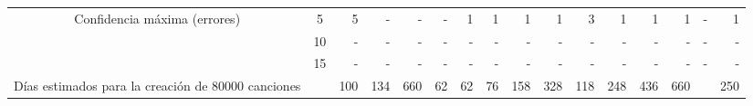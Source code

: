 \begin{sidewaystable}
\begin{tabular}{@{}ccc|rrrrrrrrrrrrrr@{}}
\midrule
\multicolumn{2}{c}{\multirow{3}{*}{Confidencia máxima (errores)}}  & 5                    & 5                      & -                      & -                      & -                      & 1                      & 1                      & 1                      & 1                      & 3                      & 1                      & 1                      & 1                      & -                      & 1                      \\
\multicolumn{2}{c}{}                                               & 10                   & -                      & -                      & -                      & -                      & -                      & -                      & -                      & -                      & -                      & -                      & -                      & -                      & -                      & -                      \\
\multicolumn{2}{c}{}                                               & 15                   & -                      & -                      & -                      & -                      & -                      & -                      & -                      & -                      & -                      & -                      & -                      & -                      & -                      & -                      \\
\midrule
\multicolumn{2}{c}{Días estimados para la creación de 80000 canciones}          &                      & 100                    & 134                    & 660                    & 62                     & 62                     & 76                     & 158                    & 328                    & 118                    & 248                    & 436                    & 660                    &                        & 250                    \\ \midrule \bottomrule


\end{tabular}
\end{sidewaystable}



























